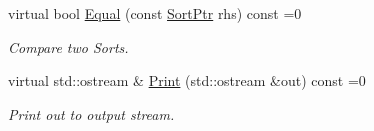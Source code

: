 \begin{DoxyCompactItemize}
\mbox{\label{classilang_1_1_sort_a3670e77914dfb7185a02a12d4dbaeab6}} 
virtual bool \mbox{\hyperlink{classilang_1_1_sort_a3670e77914dfb7185a02a12d4dbaeab6}{Equal}} (const \mbox{\hyperlink{classilang_1_1_sort_a8b9cc5e381404211a1c0423327866d3b}{Sort\+Ptr}} rhs) const =0
\begin{DoxyCompactList}\small\item\em Compare two Sorts. \end{DoxyCompactList}\item 
\mbox{\label{classilang_1_1_sort_ae17cf40bd44b0104ff9eef32a0078b4a}} 
virtual std\+::ostream \& \mbox{\hyperlink{classilang_1_1_sort_ae17cf40bd44b0104ff9eef32a0078b4a}{Print}} (std\+::ostream \&out) const =0
\begin{DoxyCompactList}\small\item\em Print out to output stream. \end{DoxyCompactList}\end{DoxyCompactItemize}
